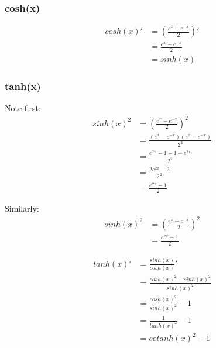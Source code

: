 \subsubsection{cosh(x)}
\begin{align*}
cosh(x)' &= (\frac{e^x+e^{-x}}{2})'
\\&= \frac{e^x-e^{-x}}{2}
\\&= sinh(x)
\end{align*}

\subsubsection{tanh(x)}

Note first:
\begin{align*}
sinh(x)^2 &= (\frac{e^x-e^{-x}}{2})^2
\\&= \frac{(e^x-e^{-x})(e^x-e^{-x})}{2^2}
\\&= \frac{e^{2x}-1-1+e^{2x}}{2^2}
\\&= \frac{2 e^{2x}-2}{2^2}
\\&= \frac{e^{2x}-1}{2}
\end{align*}

Similarly:
\begin{align*}
sinh(x)^2 &= (\frac{e^x+e^{-x}}{2})^2
\\&= \frac{e^{2x}+1}{2}
\end{align*}


\begin{align*}
tanh(x)' &= \frac{sinh(x)}{cosh(x)}'
\\&= \frac{cosh(x)^2-sinh(x)^2}{sinh(x)^2}
\\&= \frac{cosh(x)^2}{sinh(x)^2}-1
\\&= \frac{1}{tanh(x)^2}-1
\\&= cotanh(x)^2-1
\end{align*}
